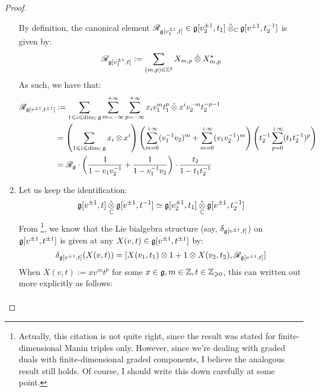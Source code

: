 \begin{proof}
\begin{enumerate}
                        By definition, the canonical element $\scrR_{\g[v_1^{\pm 1}, t]} \in \g[v_2^{\pm 1}, t_1] \hattensor_{\bbC} \g[v^{\pm 1}, t_2^{-1}]$ is given by:
                            $$\scrR_{\g[v_1^{\pm 1}, t]} := \sum_{(m, p) \in \Z^2} X_{m, p} \hattensor X_{m, p}^{\star}$$
                        As such, we have that:
                            $$
                                \begin{aligned}
                                    \scrR_{\g[v^{\pm 1}, t^{\pm 1}]} & := \sum_{1 \leq i \leq \dim_{\bbC} \g} \sum_{m = -\infty}^{+\infty} \sum_{p = -\infty}^{+\infty} x_i v_1^m t_1^p \hattensor x^i v_2^{-m} t_2^{-p - 1}
                                    \\
                                    & = \left( \sum_{1 \leq i \leq \dim_{\bbC} \g} x_i \tensor x^i \right) \left( \sum_{m = 0}^{+\infty} (v_1^{-1} v_2)^m + \sum_{m = 0}^{+\infty} (v_1 v_2^{-1})^m \right) \left( t_2^{-1} \sum_{p = 0}^{+\infty} (t_1 t_2^{-1})^p \right)
                                    \\
                                    & = \scrR_{\g} \cdot \left( \frac{1}{1 - v_1 v_2^{-1}} + \frac{1}{1 - v_1^{-1} v_2} \right) \cdot \frac{t_2}{1 - t_1 t_2^{-1}}
                                \end{aligned}
                            $$
                        \item Let us keep the identification:
                            $$\g[v^{\pm 1}, t] \hattensor_{\bbC} \g[v^{\pm 1}, t^{-1}] \cong \g[v_2^{\pm 1}, t_1] \hattensor_{\bbC} \g[v^{\pm 1}, t_2^{-1}]$$
                        From \cite[pp. 5]{etingof_kazhdan_quantisation_1}\footnote{Actually, this citation is not quite right, since the result was stated for finite-dimensional Manin triples only. However, since we're dealing with graded duals with finite-dimensional graded components, I believe the analogous result still holds. Of course, I should write this down carefully at some point.}, we know that the Lie bialgebra structure (say, $\delta_{\g[v^{\pm 1}, t]}$) on $\g[v^{\pm 1}, t^{\pm 1}]$ is given at any $X(v, t) \in \g[v^{\pm 1}, t^{\pm 1}]$ by:
                            $$\delta_{\g[v^{\pm 1}, t]}( X(v, t) ) = [X(v_1, t_1) \tensor 1 + 1 \tensor X(v_2, t_2), \scrR_{\g[v^{\pm 1}, t]}]$$
                        When $X(v, t) := x v^m t^p$ for some $x \in \g, m \in \Z, t \in \Z_{\geq 0}$, this can written out more explicitly as follows:
                            $$
                                \begin{aligned}

\end{aligned}$$
\end{enumerate}
\end{proof}

